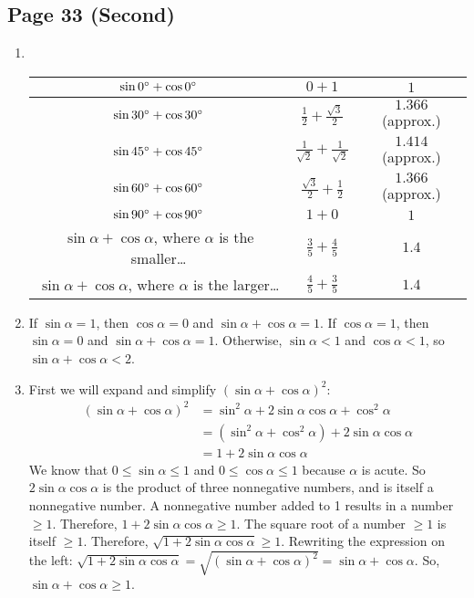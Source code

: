 \documentclass{article}
\newenvironment{solutions}[1]
{\subsection*{#1}
 \begin{enumerate}[leftmargin=1.5em]}
{\end{enumerate}}
\newcommand{\solution}{\item}
\begin{document}
\begin{solutions}{Page 33 (Second)}
\solution ~%
\begin{center}
\bgroup
\def\arraystretch{2}
\setlength\tabcolsep{15pt}
\begin{tabular}{ |c|c|c| }
\hline
$\sin{0\degree} + \cos{0\degree}$ & $0 + 1$        & $1$ \\
\hline
$\sin{30\degree} + \cos{30\degree}$ & $\frac{1}{2} + \frac{\sqrt{3}}{2}$        & $1.366$ (approx.) \\
\hline
$\sin{45\degree} + \cos{45\degree}$ & $\frac{1}{\sqrt{2}} + \frac{1}{\sqrt{2}}$ & $1.414$ (approx.) \\
\hline
$\sin{60\degree} + \cos{60\degree}$ & $\frac{\sqrt{3}}{2} + \frac{1}{2}$        & $1.366$ (approx.) \\
\hline
$\sin{90\degree} + \cos{90\degree}$ & $1 + 0$ & $1$ \\
\hline
\makecell{$\sin{\alpha} + \cos{\alpha}$, where $\alpha$\\ is the smaller\ldots} & $\frac{3}{5} + \frac{4}{5}$ & $1.4$ \\
\hline
\makecell{$\sin{\alpha} + \cos{\alpha}$, where $\alpha$\\ is the larger\ldots}  & $ \frac{4}{5} + \frac{3}{5}$ & $1.4$ \\
\hline
\end{tabular}
\egroup
\end{center}

\solution %
If $\sin{\alpha} = 1$, then $\cos{\alpha} = 0$ and $\sin{\alpha} + \cos{\alpha} = 1$.
If $\cos{\alpha} = 1$, then $\sin{\alpha} = 0$ and $\sin{\alpha} + \cos{\alpha} = 1$.
Otherwise, $\sin{\alpha} < 1$ and $\cos{\alpha} < 1$, so $\sin{\alpha} + \cos{\alpha} < 2$.

\solution %
First we will expand and simplify $(\sin{\alpha} + \cos{\alpha})^2$:
\begin{align*}
(\sin{\alpha} + \cos{\alpha})^2 &= \sin^{2}{\alpha} + 2\sin{\alpha}\cos{\alpha} + \cos^{2}{\alpha} \\
&= (\sin^{2}{\alpha} + \cos^{2}{\alpha}) + 2\sin{\alpha}\cos{\alpha} \\
&= 1 + 2\sin{\alpha}\cos{\alpha}
\end{align*}
We know that $0 \leq \sin{\alpha} \leq 1$ and $0 \leq \cos{\alpha} \leq 1$ because $\alpha$ is acute.
So $2\sin{\alpha}\cos{\alpha}$ is the product of three nonnegative numbers, and is itself a nonnegative number.
A nonnegative number added to 1 results in a number $\geq 1$.
Therefore, $1 + 2\sin{\alpha}\cos{\alpha} \geq 1$.
The square root of a number $\geq 1$ is itself $\geq 1$.
Therefore, $\sqrt{1 + 2\sin{\alpha}\cos{\alpha}} \geq 1$.
Rewriting the expression on the left: $\sqrt{1 + 2\sin{\alpha}\cos{\alpha}} = \sqrt{(\sin{\alpha} + \cos{\alpha})^2} = \sin{\alpha} + \cos{\alpha}$.
So, $\sin{\alpha} + \cos{\alpha} \geq 1$.


\end{solutions}
\end{document}

